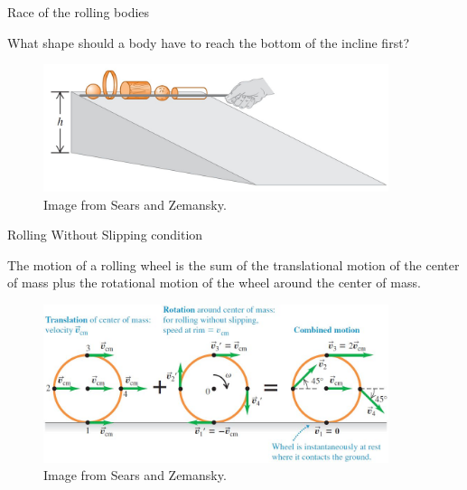 \documentclass[]{beamer}
\begin{document}

\begin{frame}


  Race of the rolling bodies
  \vspace{7mm}

  What shape should a body have to reach the bottom of the
  incline first?


  
  \begin{figure}[h!]  
    \includegraphics[width=0.9\textwidth]{images/10.jpg}
    \caption{Image from Sears and Zemansky.}
  \end{figure}

\end{frame}

\begin{frame}


  Rolling Without Slipping condition
  \vspace{7mm}

  The motion of a rolling wheel is   the sum of the translational motion of the
  center of mass plus the rotational motion   of the wheel around the center of mass.


  
  \begin{figure}[h!]  
    \includegraphics[width=0.9\textwidth]{images/9.jpg}
    \caption{Image from Sears and Zemansky. }
  \end{figure}

\end{frame}
\end{document}
